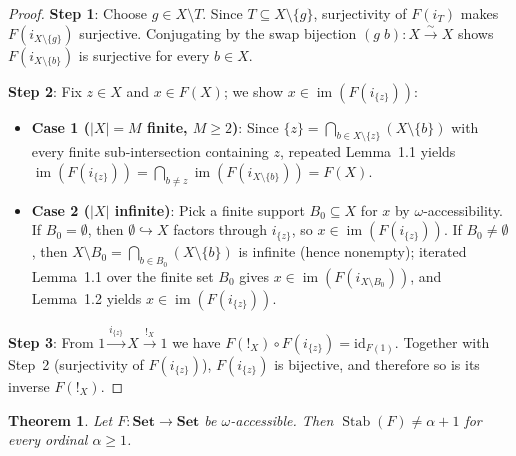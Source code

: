 \documentclass[11pt,a4paper]{article}
\theoremstyle{plain}
\newtheorem{theorem}[lemma]{Theorem}
\newcommand{\Stab}{\operatorname{Stab}}
\newcommand{\im}{\operatorname{im}}
\newcommand{\id}{\mathrm{id}}
\newcommand{\Set}{\mathbf{Set}}
\begin{document}
\begin{proof}
\textbf{Step 1}: Choose $g \in X \setminus T$. Since $T \subseteq X \setminus \{g\}$, surjectivity of $F(i_T)$ makes $F(i_{X\setminus\{g\}})$ surjective. Conjugating by the swap bijection $(g\; b) : X \xrightarrow{\sim} X$ shows $F(i_{X\setminus\{b\}})$ is surjective for every $b \in X$.

\textbf{Step 2}: Fix $z \in X$ and $x \in F(X)$; we show $x \in \im(F(i_{\{z\}}))$:
\begin{itemize}[leftmargin=2em]
  \item \textbf{Case 1 ($|X| = M$ finite, $M \ge 2$)}: Since $\{z\} = \bigcap_{b \in X \setminus \{z\}} (X \setminus \{b\})$ with every finite sub-intersection containing $z$, repeated Lemma~1.1 yields $\im(F(i_{\{z\}})) = \bigcap_{b \neq z} \im(F(i_{X\setminus\{b\}})) = F(X)$.
  \item \textbf{Case 2 ($|X|$ infinite)}: Pick a finite support $B_0 \subseteq X$ for $x$ by $\omega$-accessibility. If $B_0 = \emptyset$, then $\emptyset \hookrightarrow X$ factors through $i_{\{z\}}$, so $x \in \im(F(i_{\{z\}}))$. If $B_0 \neq \emptyset$, then $X \setminus B_0 = \bigcap_{b \in B_0} (X \setminus \{b\})$ is infinite (hence nonempty); iterated Lemma~1.1 over the finite set $B_0$ gives $x \in \im(F(i_{X \setminus B_0}))$, and Lemma~1.2 yields $x \in \im(F(i_{\{z\}}))$.
\end{itemize}

\textbf{Step 3}: From $1 \xrightarrow{i_{\{z\}}} X \xrightarrow{{!}_X} 1$ we have $F({!}_X) \circ F(i_{\{z\}}) = \id_{F(1)}$. Together with Step~2 (surjectivity of $F(i_{\{z\}})$), $F(i_{\{z\}})$ is bijective, and therefore so is its inverse $F({!}_X)$.
\end{proof}

\begin{theorem}
Let $F : \Set \to \Set$ be $\omega$-accessible. Then $\Stab(F) \neq \alpha + 1$ for every ordinal $\alpha \ge 1$.
\end{theorem}
\end{document}
